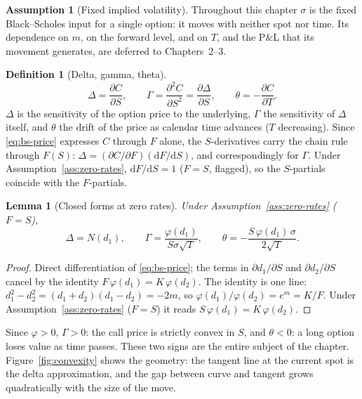 \documentclass[11pt]{book}
\theoremstyle{plain}
\newtheorem{lemma}[theorem]{Lemma}
\theoremstyle{definition}
\newtheorem{definition}[theorem]{Definition}
\newtheorem{assumption}[theorem]{Assumption}
\theoremstyle{remark}
\newcommand{\mln}{m}                             %
\newcommand{\npdf}{\varphi}                      %
\newcommand{\ncdf}{N}                            %
\newcommand{\dd}{\mathrm{d}}                                  %
\newcommand{\pd}[2]{\frac{\partial #1}{\partial #2}}          %
\newcommand{\pdd}[2]{\frac{\partial^2 #1}{\partial #2^2}}     %
\begin{document}
\begin{assumption}[Fixed implied volatility]
\label{ass:fixed-sigma}
Throughout this chapter $\sigma$ is the fixed Black--Scholes input for a single option: it moves with neither spot nor time. Its dependence on $\mln$, on the forward level, and on $T$, and the P\&L that its movement generates, are deferred to Chapters~2--3.
\end{assumption}

\begin{definition}[Delta, gamma, theta]
\label{def:greeks}
\begin{equation}
\Delta = \pd{C}{S}, \qquad
\Gamma = \pdd{C}{S} = \pd{\Delta}{S}, \qquad
\theta = -\pd{C}{T}.
\end{equation}
$\Delta$ is the sensitivity of the option price to the underlying, $\Gamma$ the sensitivity of $\Delta$ itself, and $\theta$ the drift of the price as calendar time advances ($T$ decreasing). Since \eqref{eq:bs-price} expresses $C$ through $F$ alone, the $S$-derivatives carry the chain rule through $F(S)$: $\Delta = (\partial C/\partial F)(\dd F/\dd S)$, and correspondingly for $\Gamma$. Under Assumption~\ref{ass:zero-rates}, $\dd F/\dd S = 1$ ($F = S$, flagged), so the $S$-partials coincide with the $F$-partials.
\end{definition}

\begin{lemma}[Closed forms at zero rates]
\label{lem:closed-forms}
Under Assumption~\ref{ass:zero-rates} ($F = S$),
\begin{equation}
\Delta = \ncdf(d_1), \qquad
\Gamma = \frac{\npdf(d_1)}{S\sigma\sqrt{T}}, \qquad
\theta = -\frac{S\,\npdf(d_1)\,\sigma}{2\sqrt{T}}.
\label{eq:closed-forms}
\end{equation}
\end{lemma}

\begin{proof}
Direct differentiation of \eqref{eq:bs-price}; the terms in $\partial d_1/\partial S$ and $\partial d_2/\partial S$ cancel by the identity $F\,\npdf(d_1) = K\,\npdf(d_2)$. The identity is one line: $d_1^2 - d_2^2 = (d_1 + d_2)(d_1 - d_2) = -2\mln$, so $\npdf(d_1)/\npdf(d_2) = e^{\mln} = K/F$. Under Assumption~\ref{ass:zero-rates} ($F = S$) it reads $S\,\npdf(d_1) = K\,\npdf(d_2)$.
\end{proof}

Since $\npdf > 0$, $\Gamma > 0$: the call price is strictly convex in $S$, and $\theta < 0$: a long option loses value as time passes. These two signs are the entire subject of the chapter. Figure~\ref{fig:convexity} shows the geometry: the tangent line at the current spot is the delta approximation, and the gap between curve and tangent grows quadratically with the size of the move.
\end{document}
